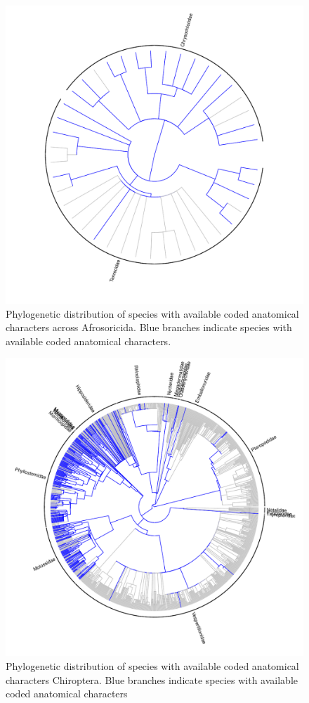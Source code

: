 \documentclass[12pt,letterpaper]{article}
\begin{document}
\begin{figure}[!htbp]
\centering
    \includegraphics[width=1\textwidth]{Supp_figure_AFROSORICIDA.pdf}
\caption{Phylogenetic distribution of species with available coded anatomical characters across Afrosoricida. Blue branches indicate species with available coded anatomical characters.}
\label{Supp_Figure_Phylo-Afrosoricida}
\end{figure}

\begin{figure}[!htbp]
\centering
    \includegraphics[width=1\textwidth]{Supp_figure_CHIROPTERA.pdf}
\caption{Phylogenetic distribution of species with available coded anatomical characters Chiroptera. Blue branches indicate species with available coded anatomical characters}
\label{Supp_Figure_Phylo-Chiroptera}
\end{figure}
\end{document}
